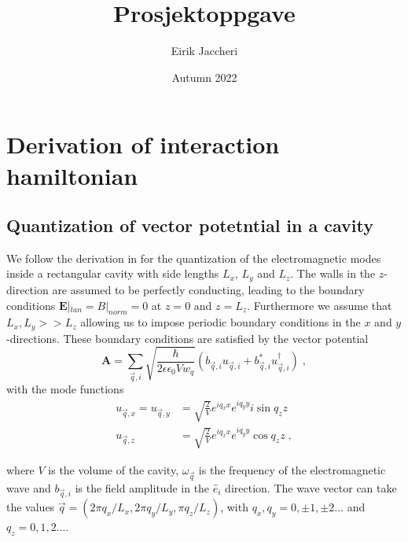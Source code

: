\documentclass{article}
\title{Prosjektoppgave}
\author{Eirik Jaccheri}
\date{Autumn 2022}
\begin{document}
\maketitle

\section{Derivation of interaction hamiltonian}

\subsection{Quantization of vector potetntial in a cavity}
We follow the derivation in \cite{QuantizationEMCavities} for the quantization of the electromagnetic modes inside a rectangular cavity with side lengths $L_x$, $L_y$ and $L_z$. The walls in the $z$-direction are assumed to be perfectly conducting, leading to the boundary conditions $\textbf{E}|_{tan} = B|_{norm} = 0$ at $z=0$ and $z = L_z$. Furthermore we assume that $L_x, L_y >> L_z$ allowing us to impose periodic boundary conditions in the $x$ and $y$-directions. These boundary conditions are satisfied by the vector potential
\begin{equation}
    \textbf{A} = \sum_{\vec{q},i} \sqrt{\frac{\hbar}{2 \epsilon \epsilon_0 V w_q}} \left(b_{\vec{q}, i} u_{\vec{q},i} + b_{\vec{q}, i}^{*} u_{\vec{q},i}^{\dagger}\right)\;,
    \label{classical vector potential}
\end{equation}
with the mode functions
\begin{align}
    u_{\vec{q}, x} = u_{\vec{q}, y} &= \sqrt{\frac{2}{V}} e^{iq_x x} e^{iq_y y} i \sin{q_z z}\nonumber\\
                     u_{\vec{q}, z} &= \sqrt{\frac{2}{V}} e^{iq_x x} e^{iq_y y} \cos{q_z z} \label{mode functions}\;,
\end{align}

where $V$ is the volume of the cavity, $\omega_{\vec{q}}$ is the frequency of the electromagnetic wave and $b_{\vec{q}, i}$ is the field amplitude in the $\hat{e}_i$ direction. The wave vector can take the values $\vec{q} = (2\pi q_x / L_x, 2\pi q_y / L_y, \pi q_z / L_z )$, with $q_x, q_y = 0, \pm 1, \pm 2...$ and $q_z = 0, 1, 2...$. 
\end{document}
